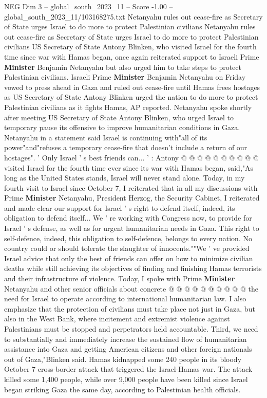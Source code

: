 \begin{textsample}{NEG Dim 3 – global\_south\_2023\_11 – Score -1.00 – global\_south\_2023\_11/103168275.txt}  \label{ex:f3_neg_103}
Netanyahu rules out cease-fire as Secretary of State urges Israel to do more to protect Palestinian civilians Netanyahu rules out cease-fire as Secretary of State urges Israel to do more to protect Palestinian civilians US Secretary of State Antony Blinken, who visited Israel for the fourth time since war with Hamas began, once again reiterated support to Israeli Prime \textbf{Minister} Benjamin Netanyahu but also urged him to take steps to protect Palestinian civilians.
Israeli Prime \textbf{Minister} Benjamin Netanyahu on Friday vowed to press ahead in Gaza and ruled out cease-fire until Hamas frees hostages as US Secretary of State Antony Blinken urged the nation to do more to protect Palestinian civilians as it fights Hamas, AP reported.
Netanyahu spoke shortly after meeting US Secretary of State Antony Blinken, who urged Israel to temporary pause its offensive to improve humanitarian conditions in Gaza.
Netanyahu in a statement said Israel is continuing with"all of its power"and"refuses a temporary cease-fire that doesn't include a return of our hostages". ' Only Israel ' s best friends can... ' : Antony @ @ @ @ @ @ @ @ @ @ visited Israel for the fourth time ever since its war with Hamas began, said,"As long as the United States stands, Israel will never stand alone.
Today, in my fourth visit to Israel since October 7, I reiterated that in all my discussions with Prime \textbf{Minister} Netanyahu, President Herzog, the Security Cabinet, I reiterated and made clear our support for Israel ' s right to defend itself, indeed, its obligation to defend itself...
We ' re working with Congress now, to provide for Israel ' s defense, as well as for urgent humanitarian needs in Gaza.
This right to self-defence, indeed, this obligation to self-defence, belongs to every nation.
No country could or should tolerate the slaughter of innocents.""We ' ve provided Israel advice that only the best of friends can offer on how to minimize civilian deaths while still achieving its objectives of finding and finishing Hamas terrorists and their infrastructure of violence.
Today, I spoke with Prime \textbf{Minister} Netanyahu and other senior officials about concrete @ @ @ @ @ @ @ @ @ @ the need for Israel to operate according to international humanitarian law.
I also emphasize that the protection of civilians must take place not just in Gaza, but also in the West Bank, where incitement and extremist violence against Palestinians must be stopped and perpetrators held accountable.
Third, we need to substantially and immediately increase the sustained flow of humanitarian assistance into Gaza and getting American citizens and other foreign nationals out of Gaza,"Blinken said.
Hamas kidnapped some 240 people in its bloody October 7 cross-border attack that triggered the Israel-Hamas war.
The attack killed some 1,400 people, while over 9,000 people have been killed since Israel began striking Gaza the same day, according to Palestinian health officials.

\end{textsample}
